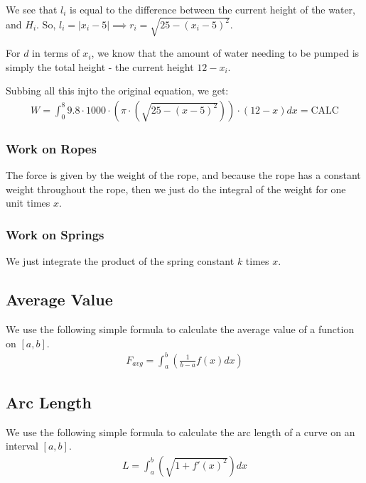 \documentclass[12pt,letterpaper]{article} \usepackage{amsmath} \usepackage{graphicx}  \usepackage{longtable}  \usepackage{amssymb}
\begin{document}
\begin{mdframed}
                We see that $l_i$ is equal to the difference between the current height of the water, and $H_i$. So, $l_i = |x_i - 5| \implies r_i = \sqrt{25-(x_i - 5)^2}$.

                For $d$ in terms of $x_i$, we know that the amount of water needing to be pumped is simply the total height - the current height $12 - x_i$.

                Subbing all this injto the original equation, we get:
                \begin{align*}
                    W = \int^8_0 9.8 \cdot 1000 \cdot (\pi \cdot (\sqrt{25-(x-5)^2}))\cdot (12-x) dx = \text{CALC}
                \end{align*}
            \end{mdframed}

            \subsubsection{Work on Ropes}
            The force is given by the weight of the rope, and because the rope has a constant weight throughout the rope, then we just do the integral of the weight for one unit times $x$.

            \subsubsection{Work on Springs}
            We just integrate the product of the spring constant $k$ times $x$. 

        \subsection{Average Value}
        We use the following simple formula to calculate the average value of a function on $[a,b]$.
        \begin{align*}
            F_{avg} = \int_a^b \left(\frac{1}{b-a} f(x)dx\right)
        \end{align*}

        \subsection{Arc Length}
        We use the following simple formula to calculate the arc length of a curve on an interval $[a,b]$.
        \begin{align*}
            L = \int^b_a \left(\sqrt{1+f'(x)^2}\right)dx
        \end{align*}
\end{document}
